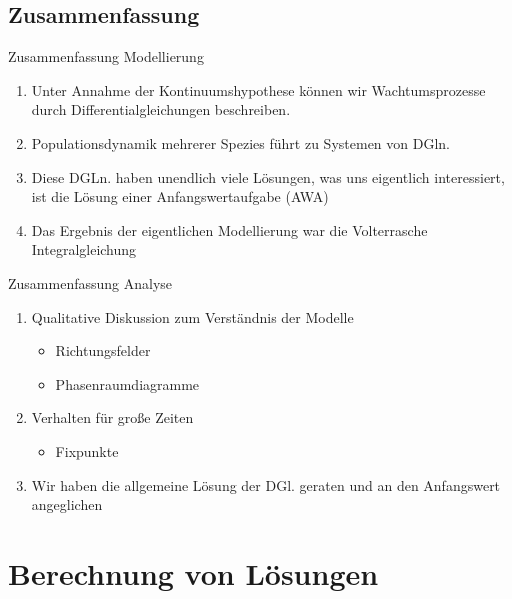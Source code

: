 \documentclass[notheorems,hidelinks,aspectratio=1610]{beamer}
\begin{document}
\subsection{Zusammenfassung}
\frame{\subtoc}

\begin{frame}{Zusammenfassung Modellierung}
  \begin{enumerate}
  \item Unter Annahme der Kontinuumshypothese können wir
    Wachtumsprozesse durch Differentialgleichungen
    beschreiben.
  \item Populationsdynamik mehrerer Spezies führt zu Systemen von DGln.
  \item Diese DGLn. haben unendlich viele Lösungen, was uns eigentlich interessiert, ist die Lösung einer Anfangswertaufgabe (AWA)
  \item Das Ergebnis der eigentlichen Modellierung war die
    Volterrasche Integralgleichung
  \end{enumerate}
\end{frame}

\begin{frame}{Zusammenfassung Analyse}
  \begin{enumerate}
  \item Qualitative Diskussion zum Verständnis der Modelle
    \begin{itemize}
    \item Richtungsfelder
    \item Phasenraumdiagramme
    \end{itemize}
  \item Verhalten für große Zeiten
    \begin{itemize}
    \item Fixpunkte
    \end{itemize}
  \item Wir haben die allgemeine Lösung der DGl. geraten und an den
    Anfangswert angeglichen
  \end{enumerate}
\end{frame}


\section{Berechnung von Lösungen}
\frame{\sectoc}

\end{document}
